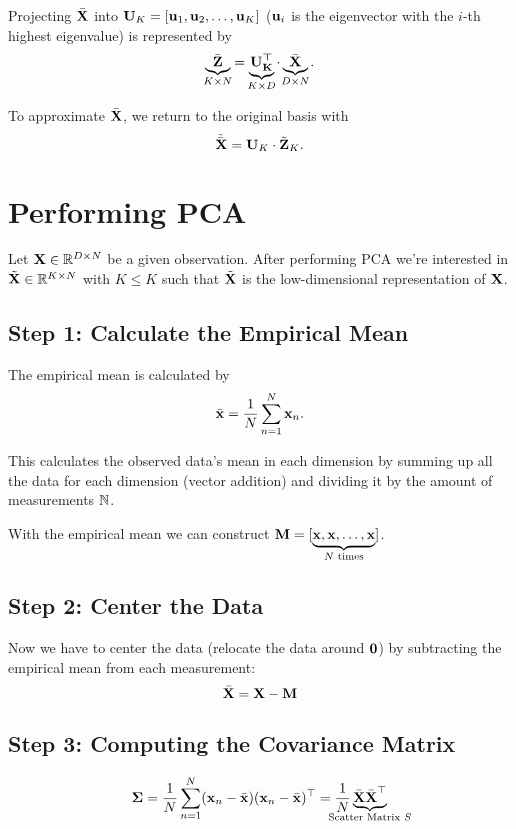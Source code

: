 Projecting \(\bar{\boldsymbol{\mathrm{X}}}\) into \(\boldsymbol{\mathrm{U}}_K = [\boldsymbol{\mathrm{u}}_1, \boldsymbol{\mathrm{u}}_2, \ldots, \boldsymbol{\mathrm{u}}_K]\) (\(\boldsymbol{\mathrm{u}}_i\) is the eigenvector with the \(i\)-th highest eigenvalue) is represented by \[
\underbrace{\bar{\matr{Z}}}_{\mathclap{K \times N}} = \underbrace{\matr{U_K^\top}}_{\mathclap{K \times D}} \cdot \underbrace{\bar{\matr{X}}}_{\mathclap{D \times N}}.
\]

To approximate \(\bar{\boldsymbol{\mathrm{X}}}\), we return to the original basis with \[
\tilde{\bar{\boldsymbol{\mathrm{X}}}} = \boldsymbol{\mathrm{U}}_K \cdot \tilde{\boldsymbol{\mathrm{Z}}}_K.
\]


\section{Performing PCA}
Let \(\boldsymbol{\mathrm{X}} \in \mathbb{R}^{D \times N}\) be a given observation. After performing PCA we're interested in \(\tilde{\boldsymbol{\mathrm{X}}} \in \mathbb{R}^{K \times N}\) with \(K \leq K\) such that \(\tilde{\boldsymbol{\mathrm{X}}}\) is the low-dimensional representation of \(\boldsymbol{\mathrm{X}}\).

\subsection{Step 1: Calculate the Empirical Mean}
The empirical mean is calculated by \[
\bar{\boldsymbol{\mathrm{x}}} = \frac{1}{N} \sum_{n=1}^N \boldsymbol{\mathrm{x}}_n.
\]

This calculates the observed data's mean in each dimension by summing up all the data for each dimension (vector addition) and dividing it by the amount of measurements \(\mathbb{N}\).

With the empirical mean we can construct \(\boldsymbol{\mathrm{M}} = [\underbrace{\boldsymbol{\mathrm{x}}, \boldsymbol{\mathrm{x}}, \ldots, \boldsymbol{\mathrm{x}}}_{N \text{ times}}]\).

\subsection{Step 2: Center the Data}
Now we have to center the data (relocate the data around \(\boldsymbol{\mathrm{0}}\)) by subtracting the empirical mean from each measurement: \[
\bar{\boldsymbol{\mathrm{X}}} = \boldsymbol{\mathrm{X}} - \boldsymbol{\mathrm{M}}
\]

\subsection{Step 3: Computing the Covariance Matrix}
\[
\matr{\Sigma} = \frac{1}{N} \sum_{n=1}^N (\matr{x}_n - \bar{\matr{x}}) (\matr{x}_n - \bar{\matr{x}})^\top = \frac{1}{N} \underbrace{\bar{\matr{X}} \bar{\matr{X}}^\top}_{\mathclap{\text{Scatter Matrix } S}}
\]


